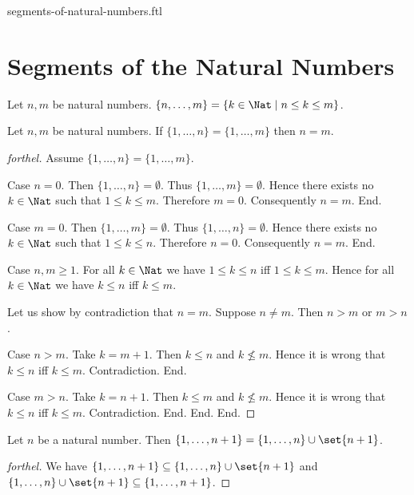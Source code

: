 \documentclass{naproche-library}
\begin{document}
\begin{smodule}{segments-of-natural-numbers.ftl}

  \section*{Segments of the Natural Numbers}

  \begin{definition}[forthel,id=FOUNDATIONS_14_3625613501923328]
    Let $n, m$ be natural numbers.
    $\{ n, \dots, m \} = \{ k \in \Nat \mid n \leq k \leq m \}$.
  \end{definition}

  \begin{proposition}[forthel,id=FOUNDATIONS_14_145331933151232]
    Let $n, m$ be natural numbers.
    If $\{ 1, \dots, n \} = \{ 1, \dots, m \}$ then $n = m$.
  \end{proposition}
  \begin{proof}[forthel]
    Assume $\{ 1, \dots, n \} = \{ 1, \dots, m \}$.

    Case $n = 0$.
      Then $\{ 1, \dots, n \} = \emptyset$.
      Thus $\{ 1, \dots, m \} = \emptyset$.
      Hence there exists no $k \in \Nat$ such that $1 \leq k \leq m$.
      Therefore $m = 0$.
      Consequently $n = m$.
    End.

    Case $m = 0$.
      Then $\{ 1, \dots, m \} = \emptyset$.
      Thus $\{ 1, \dots, n \} = \emptyset$.
      Hence there exists no $k \in \Nat$ such that $1 \leq k \leq n$.
      Therefore $n = 0$.
      Consequently $n = m$.
    End.

    Case $n, m \geq 1$.
      For all $k \in \Nat$ we have $1 \leq k \leq n$ iff $1 \leq k \leq m$.
      Hence for all $k \in \Nat$ we have $k \leq n$ iff $k \leq m$.

      Let us show by contradiction that $n = m$.
        Suppose $n \neq m$.
        Then $n > m$ or $m > n$.

        Case $n > m$.
          Take $k = m + 1$.
          Then $k \leq n$ and $k \nleq m$.
          Hence it is wrong that $k \leq n$ iff $k \leq m$.
          Contradiction.
        End.

        Case $m > n$.
          Take $k = n + 1$.
          Then $k \leq m$ and $k \nleq m$.
          Hence it is wrong that $k \leq n$ iff $k \leq m$.
          Contradiction.
        End.
      End.
    End.
  \end{proof}

  \begin{proposition}[forthel,id=FOUNDATIONS_14_658708738605056]
    Let $n$ be a natural number.
    Then $\{ 1, \dots, n + 1 \} = \{ 1, \dots, n \} \cup \set{n + 1}$.
  \end{proposition}
  \begin{proof}[forthel]
    We have
    $\{ 1, \dots, n + 1 \} \subseteq \{ 1, \dots, n \} \cup \set{n + 1}$ and $\{ 1, \dots, n \} \cup \set{n + 1} \subseteq \{ 1, \dots, n + 1 \}$.
  \end{proof}
\end{smodule}
\end{document}
